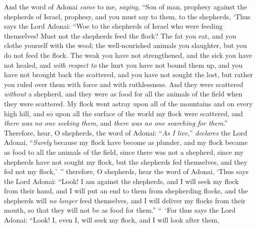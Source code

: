 \begin{biblechapter} %
 And the word of Adonai \textit{came} to me, \textit{saying},
\verse “Son of man, prophesy against the shepherds of Israel, prophesy, and you must say to them, to the shepherds, ‘Thus says the Lord Adonai: “Woe to the shepherds of Israel who were feeding themselves! Must not the shepherds feed the flock?
\verse The fat you eat, and you clothe yourself with the wool; the well-nourished animals you slaughter, but you do not feed the flock.
\verse The weak you have not strengthened, and the sick you have not healed, and \textit{with respect to} the hurt you have not bound them up, and you have not brought back the scattered, and you have not sought the lost, but rather you ruled over them with force and with ruthlessness.
\verse And they were scattered \textit{without} a shepherd, and they were as food for all the animals of the field when they were scattered.
\verse My flock went astray upon all of the mountains and on every high hill, and so upon all the surface of the world my flock were scattered, and \textit{there was no one seeking them}, and \textit{there was no one searching for them}.”
\verse Therefore, hear, O shepherds, the word of Adonai:
\verse “\textit{As I live},” \textit{declares} the Lord Adonai, “\textit{Surely} because my flock have become as plunder, and my flock became as food to all the animals of the field, since there was not a shepherd, since my shepherds have not sought my flock, but the shepherds fed themselves, and they fed not my flock,’ ”
\verse therefore, O shepherds, hear the word of Adonai,
\verse ‘Thus says the Lord Adonai: “Look! I am against the shepherds, and I will seek my flock from their hand, and I will put an end to them from shepherding flocks, and the shepherds will \textit{no longer} feed themselves, and I will deliver my flocks from their mouth, so that they will not be as food for them.”
\verse “ ‘For thus says the Lord Adonai: “Look! I, even I, will seek my flock, and I will look after them,

\end{biblechapter}
